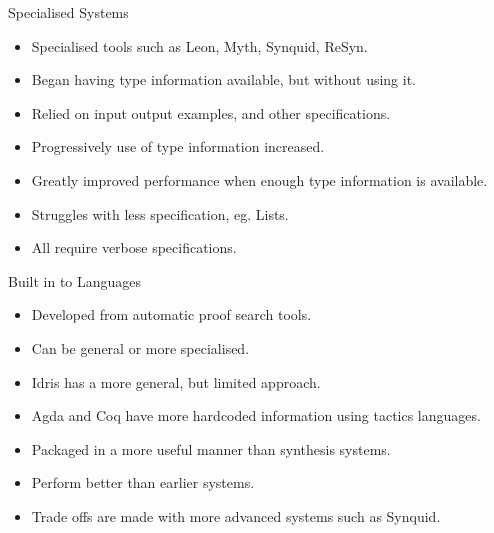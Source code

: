 \documentclass[presentation]{beamer}
\begin{document}
\begin{frame}[fragile]{Specialised Systems}
  \begin{itemize}
  \item Specialised tools such as Leon, Myth, Synquid, ReSyn.\\
  \item Began having type information available, but without using it.\\
  \item Relied on input output examples, and other specifications. \\
  \item Progressively use of type information increased.\\
  \item Greatly improved performance when enough type information is
    available.\\
  \item Struggles with less specification, eg. Lists.\\
  \item All require verbose specifications.
  \end{itemize}
\end{frame}

\begin{frame}[fragile]{Built in to Languages}
  \begin{itemize}
  \item Developed from automatic proof search tools.\\
  \item Can be general or more specialised.\\
  \item Idris has a more general, but limited approach.\\
  \item Agda and Coq have more hardcoded information using tactics languages.\\
  \item Packaged in a more useful manner than synthesis systems.\\
  \item Perform better than earlier systems.\\
  \item Trade offs are made with more advanced systems such as Synquid.\\
  \end{itemize}
\end{frame}
\end{document}
